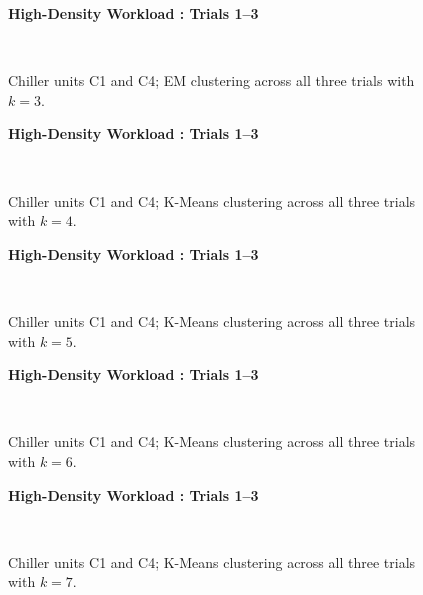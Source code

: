 \begin{figure}[!h]
\centerline{\bfseries\large High-Density Workload : Trials 1--3}\\
\caption{Chiller units C1 and C4; EM clustering across all three trials with $k=3$.}
\end{figure}
\begin{figure}[!h]
\centerline{\bfseries\large High-Density Workload : Trials 1--3}\\
\caption{Chiller units C1 and C4; K-Means clustering across all three trials with $k=4$.}
\end{figure}
\begin{figure}[!h]
\centerline{\bfseries\large High-Density Workload : Trials 1--3}\\
\caption{Chiller units C1 and C4; K-Means clustering across all three trials with $k=5$.}
\end{figure}
\begin{figure}[!h]
\centerline{\bfseries\large High-Density Workload : Trials 1--3}\\
\caption{Chiller units C1 and C4; K-Means clustering across all three trials with $k=6$.}
\end{figure}
\begin{figure}[!h]
\centerline{\bfseries\large High-Density Workload : Trials 1--3}\\
\caption{Chiller units C1 and C4; K-Means clustering across all three trials with $k=7$.}
\end{figure}

